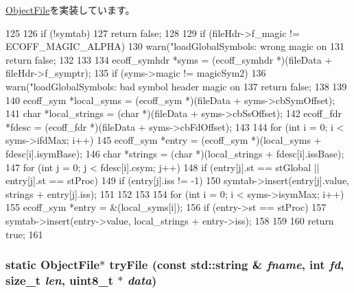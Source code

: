 \hyperlink{classObjectFile_a15e7fbacc339ac9a4d50e4aa36591339}{ObjectFile}を実装しています。


\begin{DoxyCode}
125 {
126     if (!symtab)
127         return false;
128 
129     if (fileHdr->f_magic != ECOFF_MAGIC_ALPHA) {
130         warn("loadGlobalSymbols: wrong magic on %
131         return false;
132     }
133 
134     ecoff_symhdr *syms = (ecoff_symhdr *)(fileData + fileHdr->f_symptr);
135     if (syms->magic != magicSym2) {
136         warn("loadGlobalSymbols: bad symbol header magic on %
137         return false;
138     }
139 
140     ecoff_sym *local_syms = (ecoff_sym *)(fileData + syms->cbSymOffset);
141     char *local_strings = (char *)(fileData + syms->cbSsOffset);
142     ecoff_fdr *fdesc = (ecoff_fdr *)(fileData + syms->cbFdOffset);
143 
144     for (int i = 0; i < syms->ifdMax; i++) {
145         ecoff_sym *entry = (ecoff_sym *)(local_syms + fdesc[i].isymBase);
146         char *strings = (char *)(local_strings + fdesc[i].issBase);
147         for (int j = 0; j < fdesc[i].csym; j++) {
148             if (entry[j].st == stGlobal || entry[j].st == stProc)
149                 if (entry[j].iss != -1)
150                     symtab->insert(entry[j].value, strings + entry[j].iss);
151         }
152     }
153 
154     for (int i = 0; i < syms->isymMax; i++) {
155         ecoff_sym *entry = &(local_syms[i]);
156         if (entry->st == stProc)
157             symtab->insert(entry->value, local_strings + entry->iss);
158     }
159 
160     return true;
161 }
\end{DoxyCode}
\hypertarget{classEcoffObject_af96c4ced69d653731f78ba9d9006e251}{
\subsubsection[{tryFile}]{\setlength{\rightskip}{0pt plus 5cm}static {\bf ObjectFile}$\ast$ tryFile (const std::string \& {\em fname}, \/  int {\em fd}, \/  size\_\-t {\em len}, \/  uint8\_\-t $\ast$ {\em data})}}
\label{classEcoffObject_af96c4ced69d653731f78ba9d9006e251}


